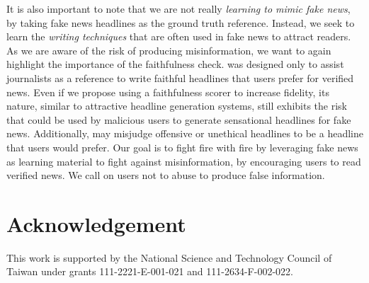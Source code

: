 It is also important to note that we are not really \emph{learning to mimic fake news},
by taking fake news headlines as the ground truth reference. Instead, we seek to
learn the \emph{writing techniques} that are often used in fake news to attract
readers. As we are aware of the risk of producing misinformation, we want to
again highlight the importance of the faithfulness check. \modelname was 
designed only to assist journalists as a reference to write 
faithful headlines that users prefer for verified news. Even if we propose using a faithfulness
scorer to increase fidelity, its nature, similar to attractive headline
generation systems, still exhibits the risk that \modelname could be used by
malicious users to generate sensational headlines for fake news. 
Additionally, \modelname may misjudge offensive or unethical headlines to be
a headline that users would prefer. 
Our goal is 
  to fight fire with fire by leveraging   %
fake news as learning material to
fight against misinformation, by encouraging users to read verified news. We call on users not to abuse \modelname to produce false information.
\section*{Acknowledgement}
This work is supported by the National Science and Technology Council of Taiwan under grants 111-2221-E-001-021 and 111-2634-F-002-022.